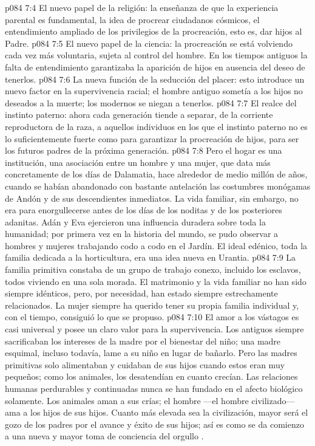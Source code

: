 \vs p084 7:4 El nuevo papel de la religión: la enseñanza de que la experiencia parental es fundamental, la idea de procrear ciudadanos cósmicos, el entendimiento ampliado de los privilegios de la procreación, esto es, dar hijos al Padre.
\vs p084 7:5 El nuevo papel de la ciencia: la procreación se está volviendo cada vez más voluntaria, sujeta al control del hombre. En los tiempos antiguos la falta de entendimiento garantizaba la aparición de hijos en ausencia del deseo de tenerlos.
\vs p084 7:6 La nueva función de la seducción del placer: esto introduce un nuevo factor en la supervivencia racial; el hombre antiguo sometía a los hijos no deseados a la muerte; los modernos se niegan a tenerlos.
\vs p084 7:7 El realce del instinto paterno: ahora cada generación tiende a separar, de la corriente reproductora de la raza, a aquellos individuos en los que el instinto paterno no es lo suficientemente fuerte como para garantizar la procreación de hijos, para ser los futuros padres de la próxima generación.
\vs p084 7:8 \pc Pero el hogar es una institución, una asociación entre un hombre y una mujer, que data más concretamente de los días de Dalamatia, hace alrededor de medio millón de años, cuando se habían abandonado con bastante antelación las costumbres monógamas de Andón y de sus descendientes inmediatos. La vida familiar, sin embargo, no era para enorgullecerse antes de los días de los noditas y de los posteriores adanitas. Adán y Eva ejercieron una influencia duradera sobre toda la humanidad; por primera vez en la historia del mundo, se pudo observar a hombres y mujeres trabajando codo a codo en el Jardín. El ideal edénico, toda la familia dedicada a la horticultura, era una idea nueva en Urantia.
\vs p084 7:9 La familia primitiva constaba de un grupo de trabajo conexo, incluido los esclavos, todos viviendo en una sola morada. El matrimonio y la vida familiar no han sido siempre idénticos, pero, por necesidad, han estado siempre estrechamente relacionados. La mujer siempre ha querido tener su propia familia individual y, con el tiempo, consiguió lo que se propuso.
\vs p084 7:10 \pc El amor a los vástagos es casi universal y posee un claro valor para la supervivencia. Los antiguos siempre sacrificaban los intereses de la madre por el bienestar del niño; una madre esquimal, incluso todavía, lame a su niño en lugar de bañarlo. Pero las madres primitivas solo alimentaban y cuidaban de sus hijos cuando estos eran muy pequeños; como los animales, los desatendían en cuanto crecían. Las relaciones humanas perdurables y continuadas nunca se han fundado en el afecto biológico solamente. Los animales aman a sus crías; el hombre ---el hombre civilizado--- ama a los hijos de sus hijos. Cuanto más elevada sea la civilización, mayor será el gozo de los padres por el avance y éxito de sus hijos; así es como se da comienzo a una nueva y mayor toma de conciencia del orgullo .
